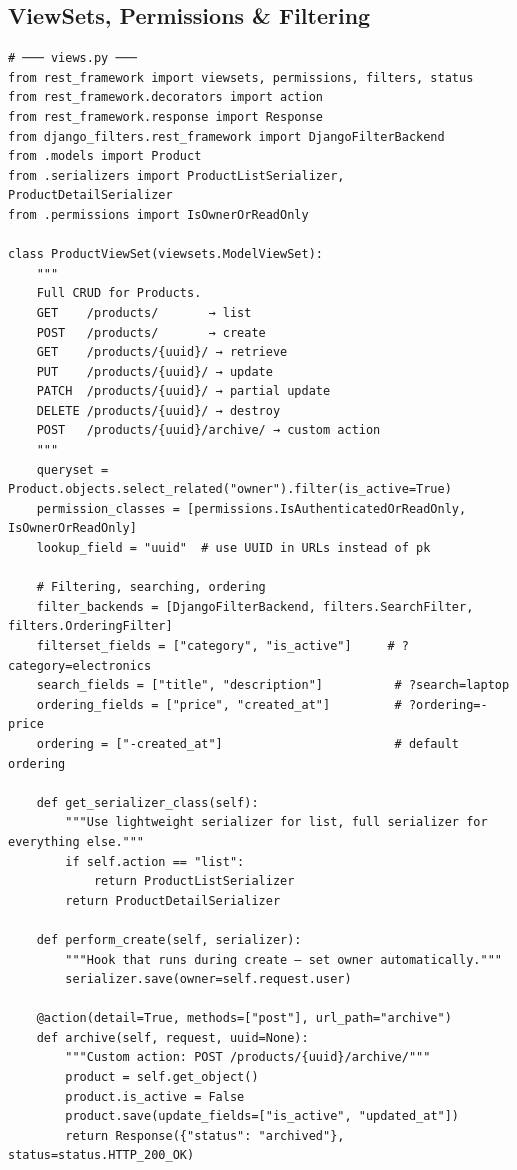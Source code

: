 \documentclass[10pt, a4paper]{article}
\begin{document}
\subsection{ViewSets, Permissions \& Filtering}


\begin{lstlisting}[language=mypython]
# ─── views.py ───
from rest_framework import viewsets, permissions, filters, status
from rest_framework.decorators import action
from rest_framework.response import Response
from django_filters.rest_framework import DjangoFilterBackend
from .models import Product
from .serializers import ProductListSerializer, ProductDetailSerializer
from .permissions import IsOwnerOrReadOnly

class ProductViewSet(viewsets.ModelViewSet):
    """
    Full CRUD for Products.
    GET    /products/       → list
    POST   /products/       → create
    GET    /products/{uuid}/ → retrieve
    PUT    /products/{uuid}/ → update
    PATCH  /products/{uuid}/ → partial update
    DELETE /products/{uuid}/ → destroy
    POST   /products/{uuid}/archive/ → custom action
    """
    queryset = Product.objects.select_related("owner").filter(is_active=True)
    permission_classes = [permissions.IsAuthenticatedOrReadOnly, IsOwnerOrReadOnly]
    lookup_field = "uuid"  # use UUID in URLs instead of pk
    
    # Filtering, searching, ordering
    filter_backends = [DjangoFilterBackend, filters.SearchFilter, filters.OrderingFilter]
    filterset_fields = ["category", "is_active"]     # ?category=electronics
    search_fields = ["title", "description"]          # ?search=laptop
    ordering_fields = ["price", "created_at"]         # ?ordering=-price
    ordering = ["-created_at"]                        # default ordering
    
    def get_serializer_class(self):
        """Use lightweight serializer for list, full serializer for everything else."""
        if self.action == "list":
            return ProductListSerializer
        return ProductDetailSerializer
    
    def perform_create(self, serializer):
        """Hook that runs during create — set owner automatically."""
        serializer.save(owner=self.request.user)
    
    @action(detail=True, methods=["post"], url_path="archive")
    def archive(self, request, uuid=None):
        """Custom action: POST /products/{uuid}/archive/"""
        product = self.get_object()
        product.is_active = False
        product.save(update_fields=["is_active", "updated_at"])
        return Response({"status": "archived"}, status=status.HTTP_200_OK)
\end{lstlisting}
\end{document}
